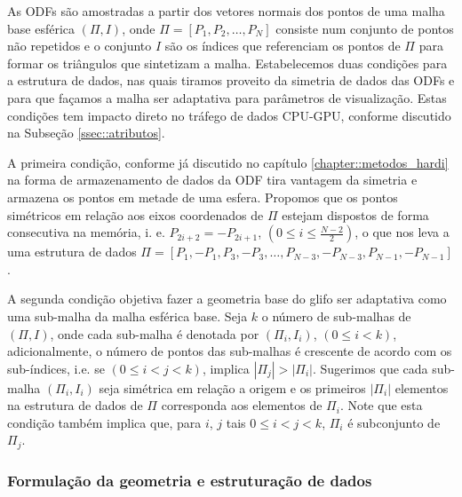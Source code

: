\documentclass[
    12pt,                %
    oneside,            %
    a4paper,            %
    english,            %
    french,                %
    spanish,            %
    brazil                %
    ]{abntex2}
\begin{document}
As ODFs são amostradas a partir dos vetores normais dos pontos de uma malha base esférica $(\Pi, I)$, onde $\Pi = [P_1, P_2, \dots, P_N]$ consiste num conjunto de pontos não repetidos e o conjunto $I$ são os índices que referenciam os pontos de $\Pi$ para formar os triângulos que sintetizam a malha. Estabelecemos duas condições para a estrutura de dados, nas quais tiramos proveito da simetria de dados das ODFs e para que façamos a malha ser adaptativa para parâmetros de visualização. Estas condições tem impacto direto no tráfego de dados CPU-GPU, conforme discutido na Subseção \ref{ssec::atributos}.

A primeira condição, conforme já discutido no capítulo \ref{chapter::metodos_hardi} na forma de armazenamento de dados da ODF tira vantagem da simetria e armazena os pontos em metade de uma esfera. Propomos que os pontos simétricos em relação aos eixos coordenados de $\Pi$ estejam dispostos de forma consecutiva na memória, i. e. $P_{2i+2} = -P_{2i+1}$, $(0 \leq i \leq \frac{N-2}{2})$, o que nos leva a uma estrutura de dados $\Pi = [P_1, -P_1, P_3, -P_3, \dots, P_{N-3}, -P_{N-3}, P_{N-1}, -P_{N-1}]$.

A segunda condição objetiva fazer a geometria base do glifo ser adaptativa como uma sub-malha da malha esférica base. Seja $k$ o número de sub-malhas de $(\Pi, I)$, onde cada sub-malha é denotada por $(\Pi_i, I_i)$,  $(0 \leq i < k)$, adicionalmente, o número de pontos das sub-malhas é crescente de acordo com os sub-índices, i.e. se $(0 \leq i < j < k)$, implica $|\Pi_j| > |\Pi_i|$. Sugerimos que cada sub-malha $(\Pi_i, I_i)$ seja simétrica em relação a origem e os primeiros $|\Pi_i|$ elementos na estrutura de dados de $\Pi$ corresponda aos elementos de $\Pi_i$. Note que esta condição também implica que, para $i$, $j$ tais $0 \leq i < j < k$, $\Pi_i$ é subconjunto de $\Pi_j$.

\subsubsection{Formulação da geometria e estruturação de dados}
\label{sssec::formulação_da_geometria_e_estruturação_de_dados}

\end{document}
